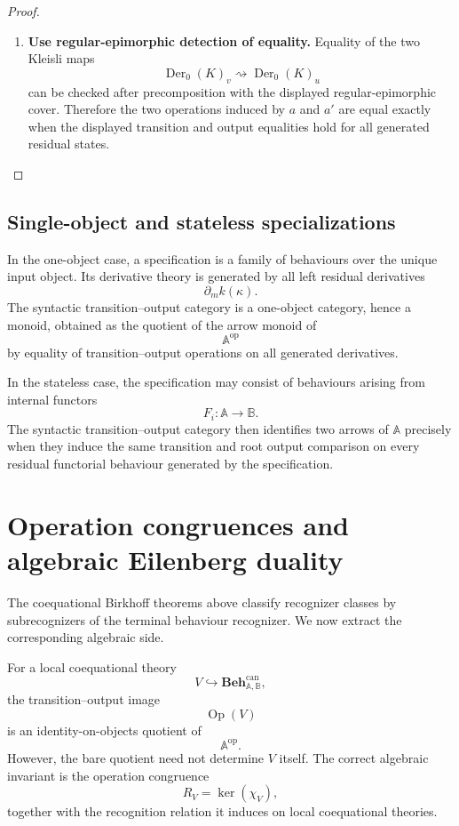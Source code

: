 \begin{proof}
\begin{enumerate}
        \item \textbf{Use regular-epimorphic detection of equality.}
        Equality of the two Kleisli maps
        \[
            \operatorname{Der}_0(K)_v\rightsquigarrow
            \operatorname{Der}_0(K)_u
        \]
        can be checked after precomposition with the displayed
        regular-epimorphic cover. Therefore the two operations induced by
        \(a\) and \(a'\) are equal exactly when the displayed transition and
        output equalities hold for all generated residual states.
    \end{enumerate}
\end{proof}

\subsection{Single-object and stateless specializations}
\label{subsec:syntactic-single-object-stateless}

In the one-object case, a specification is a family of behaviours over the
unique input object. Its derivative theory is generated by all left residual
derivatives
\[
    \partial_m k(\kappa).
\]
The syntactic transition--output category is a one-object category, hence a
monoid, obtained as the quotient of the arrow monoid of
\[
    \mathbb A^{\mathrm{op}}
\]
by equality of transition--output operations on all generated derivatives.

In the stateless case, the specification may consist of behaviours arising
from internal functors
\[
    F_i:\mathbb A\to\mathbb B.
\]
The syntactic transition--output category then identifies two arrows of
\(\mathbb A\) precisely when they induce the same transition and root output
comparison on every residual functorial behaviour generated by the
specification.

\section{Operation congruences and algebraic Eilenberg duality}
\label{sec:operation-congruences-eilenberg}

The coequational Birkhoff theorems above classify recognizer classes by
subrecognizers of the terminal behaviour recognizer. We now extract the
corresponding algebraic side.

For a local coequational theory
\[
    V\hookrightarrow\mathbf{Beh}^{\mathrm{can}}_{\mathbb A,\mathbb B},
\]
the transition--output image
\[
    \operatorname{Op}(V)
\]
is an identity-on-objects quotient of
\[
    \mathbb A^{\mathrm{op}}.
\]
However, the bare quotient need not determine \(V\) itself. The correct
algebraic invariant is the operation congruence
\[
    R_V=\ker(\chi_V),
\]
together with the recognition relation it induces on local coequational
theories.

